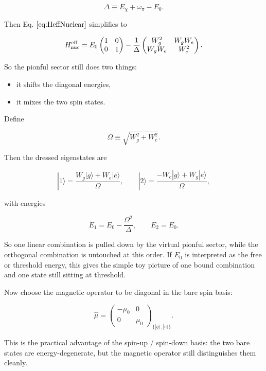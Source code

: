 \documentclass[
]{article}
\renewcommand{\[}{\begin{equation}}
\renewcommand{\]}{\end{equation}}
\providecommand{\tightlist}{%
  \setlength{\itemsep}{0pt}\setlength{\parskip}{0pt}}
\begin{document}
\[
\Delta \equiv E_\chi + \omega_\pi - E_0.
\label{eq:spinflipgap}
\]

Then Eq. \(\ref{eq:HeffNuclear}\) simplifies to

\[
H_{\rm nuc}^{\rm eff} =
E_0
\begin{pmatrix}
1 & 0 \\
0 & 1
\end{pmatrix} -
\frac{1}{\Delta}
\begin{pmatrix}
W_g^2 & W_gW_e \\
W_gW_e & W_e^2
\end{pmatrix}.
\label{eq:spinflipHeff}
\]

So the pionful sector still does two things:

\begin{itemize}
\tightlist
\item
  it shifts the diagonal energies,
\item
  it mixes the two spin states.
\end{itemize}

Define

\[
\Omega \equiv \sqrt{W_g^2 + W_e^2}.
\label{eq:spinflipOmega}
\]

Then the dressed eigenstates are

\[
|1\rangle =
\frac{W_g|g\rangle + W_e|e\rangle}{\Omega},
\qquad
|2\rangle =
\frac{-W_e|g\rangle + W_g|e\rangle}{\Omega},
\label{eq:spinflipdressed}
\]

with energies

\[
E_1 = E_0 - \frac{\Omega^2}{\Delta},
\qquad
E_2 = E_0.
\label{eq:spinflipenergies}
\]

So one linear combination is pulled down by the virtual pionful sector,
while the orthogonal combination is untouched at this order. If \(E_0\)
is interpreted as the free or threshold energy, this gives the simple
toy picture of one bound combination and one state still sitting at
threshold.

Now choose the magnetic operator to be diagonal in the bare spin basis:

\[
\hat{\mu} =
\begin{pmatrix}
-\mu_0 & 0 \\
0 & \mu_0
\end{pmatrix}_{\{|g\rangle,|e\rangle\}}.
\label{eq:spinflipmu}
\]

This is the practical advantage of the spin-up / spin-down basis: the
two bare states are energy-degenerate, but the magnetic operator still
distinguishes them cleanly.
\end{document}
